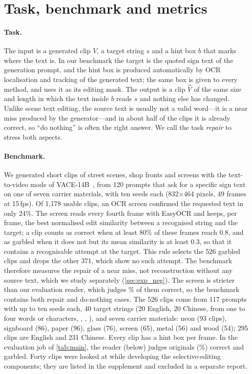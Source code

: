 \section{Task, benchmark and metrics}
\label{sec:task}

\paragraph{Task.} The input is a generated clip $V$, a target string $s$ and a hint box $b$ that marks where the text is. In our benchmark the target is the quoted sign text of the generation prompt, and the hint box is produced automatically by OCR localisation and tracking of the generated text; the same box is given to every method, and \steer uses it as its editing mask. The output is a clip $\hat V$ of the same size and length in which the text inside $b$ reads $s$ and nothing else has changed. Unlike scene text editing, the source text is usually not a valid word---it is a near miss produced by the generator---and in about half of the clips it is already correct, so ``do nothing'' is often the right answer. We call the task \emph{repair} to stress both aspects.

\paragraph{Benchmark.} We generated short clips of street scenes, shop fronts and screens with the text-to-video mode of VACE-14B~\cite{jiang2025vace}, from 120 prompts that ask for a specific sign text on one of seven carrier materials, with ten seeds each (832$\times$464 pixels, 49 frames at 15\,fps). Of 1{,}178 usable clips, an OCR screen confirmed the requested text in only 24\%. The screen reads every fourth frame with EasyOCR and keeps, per frame, the best normalised edit similarity between a recognised string and the target; a clip counts as correct when at least 80\% of these frames reach 0.8, and as garbled when it does not but its mean similarity is at least 0.3, so that it contains a recognisable attempt at the target. This rule selects the 526 garbled clips and drops the other 371, which show no such attempt. The benchmark therefore measures the repair of a near miss, not reconstruction without any source text, which we study separately (\cref{sec:exp_neg}). The screen is stricter than our evaluation reader, which judges \rOrigRead\% of them correct, so the benchmark contains both repair and do-nothing cases. The 526 clips come from 117 prompts with up to ten seeds each, 40 target strings (20 English, 20 Chinese, from one to four words or characters, \eg {}, , ), and seven carrier materials: neon (93 clips), signboard (86), paper (96), glass (76), screen (65), metal (56) and wood (54); 295 clips are English and 231 Chinese. Every clip has a hint box per frame. In the evaluation job of \cref{tab:main}, the reader (below) judges \rOrigCorrect{} originals (\rOrigRead\%) correct and \rGarbled{} garbled. Forty clips were looked at while developing the selective-editing components; they are listed in the supplement and excluded in a separate report.

